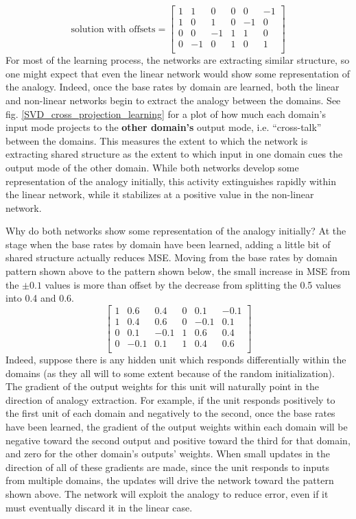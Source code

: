 \documentclass[10pt,letterpaper]{article}
\begin{document}
{ 
\[
\text{solution with offsets} = \left[ \begin{matrix} 
1 & 1 & 0 & 0 & 0 & -1 \\
1 & 0 & 1 & 0 & -1 & 0 \\
 0 & 0 & -1 & 1 & 1 & 0\\
 0 & -1 & 0 & 1 & 0 & 1\\
\end{matrix}  \right] 
\]
}
For most of the learning process, the networks are extracting similar structure, so one might expect that even the linear network would show some representation of the analogy. Indeed, once the base rates by domain are learned, both the linear and non-linear networks begin to extract the analogy between the domains. See fig. \ref{SVD_cross_projection_learning} for a plot of how much each domain's input mode projects to the \textbf{other domain's} output mode, i.e. ``cross-talk'' between the domains. This measures the extent to which the network is extracting shared structure as the extent to which input in one domain cues the output mode of the other domain. While both networks develop some representation of the analogy initially, this activity extinguishes rapidly within the linear network, while it stabilizes at a positive value in the non-linear network. \par
Why do both networks show some representation of the analogy initially? At the stage when the base rates by domain have been learned, adding a little bit of shared structure actually reduces MSE. Moving from the base rates by domain pattern shown above to the pattern shown below, the small increase in MSE from the \(\pm 0.1\) values is more than offset by the decrease from splitting the 0.5 values into 0.4 and 0.6. 
{ 
\[
\left[ \begin{matrix} 
1 & 0.6 & 0.4 & 0 & 0.1 & -0.1 \\
1 & 0.4 & 0.6 & 0 & -0.1 & 0.1 \\
0 & 0.1 & -0.1 & 1 & 0.6 & 0.4  \\
0 & -0.1 & 0.1 & 1 & 0.4 & 0.6  \\
\end{matrix}  \right] 
\] 
}
Indeed, suppose there is any hidden unit which responds differentially within the domains (as they all will to some extent because of the random initialization). The gradient of the output weights for this unit will naturally point in the direction of analogy extraction. For example, if the unit responds positively to the first unit of each domain and negatively to the second, once the base rates have been learned, the gradient of the output weights within each domain will be negative toward the second output and positive toward the third for that domain, and zero for the other domain's outputs' weights. When small updates in the direction of all of these gradients are made, since the unit responds to inputs from multiple domains, the updates will drive the network toward the pattern shown above. The network will exploit the analogy to reduce error, even if it must eventually discard it in the linear case.  \par
\end{document}

